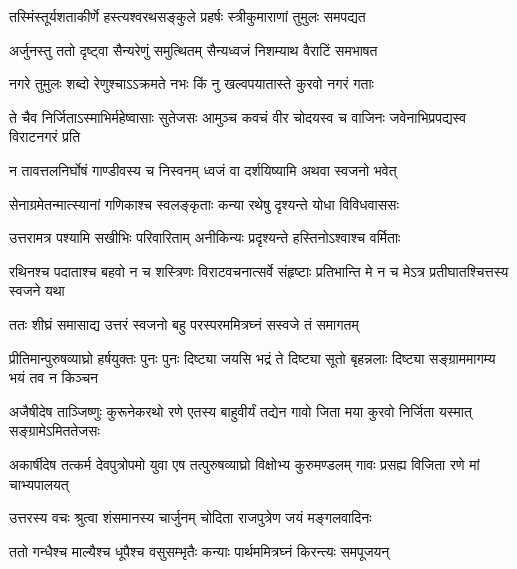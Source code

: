 \twolineshloka
{तस्मिंस्तूर्यशताकीर्णे हस्त्यश्वरथसङ्कुले}
{प्रहर्षः स्त्रीकुमाराणां तुमुलः समपद्यत}


\twolineshloka
{अर्जुनस्तु ततो दृष्ट्वा सैन्यरेणुं समुत्थितम्}
{सैन्यध्वजं निशम्याथ वैराटिं समभाषत}


\twolineshloka
{नगरे तुमुलः शब्दो रेणुश्चाऽऽक्रमते नभः}
{किं नु खल्वपयातास्ते कुरवो नगरं गताः}


\threelineshloka
{ते चैव निर्जिताऽस्माभिर्महेष्वासाः सुतेजसः}
{आमुञ्च कवचं वीर चोदयस्व च वाजिनः}
{जवेनाभिप्रपद्यस्व विराटनगरं प्रति}


\twolineshloka
{न तावत्तलनिर्घोषं गाण्डीवस्य च निस्वनम्}
{ध्वजं वा दर्शयिष्यामि अथवा स्वजनो भवेत्}




\twolineshloka
{सेनाग्रमेतन्मात्स्यानां गणिकाश्च स्वलङ्कृताः}
{कन्या रथेषु दृश्यन्ते योधा विविधवाससः}


\twolineshloka
{उत्तरामत्र पश्यामि सखीभिः परिवारिताम्}
{अनीकिन्यः प्रदृश्यन्ते हस्तिनोऽश्वाश्च वर्मिताः}


\threelineshloka
{रथिनश्च पदाताश्च बहवो न च शस्त्रिणः}
{विराटवचनात्सर्वे संहृष्टाः प्रतिभान्ति मे}
{न च मेऽत्र प्रतीघातश्चित्तस्य स्वजने यथा}



\twolineshloka
{ततः शीघ्रं समासाद्य उत्तरं स्वजनो बहु}
{परस्परममित्रघ्नं सस्वजे तं समागतम्}




\threelineshloka
{प्रीतिमान्पुरुषव्याघ्रो हर्षयुक्तः पुनः पुनः}
{दिष्ट्या जयसि भद्रं ते दिष्ट्या सूतो बृहन्नलाः}
{दिष्ट्या सङ्ग्राममागम्य भयं तव न किञ्चन}




\threelineshloka
{अजैषीदेष ताञ्जिष्णुः कुरूनेकरथो रणे}
{एतस्य बाहुवीर्यं तद्येन गावो जिता मया}
{कुरवो निर्जिता यस्मात् सङ्ग्रामेऽमिततेजसः}


\threelineshloka
{अकार्षीदेष तत्कर्म देवपुत्रोपमो युवा}
{एष तत्पुरुषव्याघ्रो विक्षोभ्य कुरुमण्डलम्}
{गावः प्रसह्य विजिता रणे मां चाभ्यपालयत्}



\twolineshloka
{उत्तरस्य वचः श्रुत्वा शंसमानस्य चार्जुनम्}
{चोदिता राजपुत्रेण जयं मङ्गलवादिनः}


\twolineshloka
{ततो गन्धैश्च माल्यैश्च धूपैश्च वसुसम्भृतैः}
{कन्याः पार्थममित्रघ्नं किरन्त्यः समपूजयन्}


